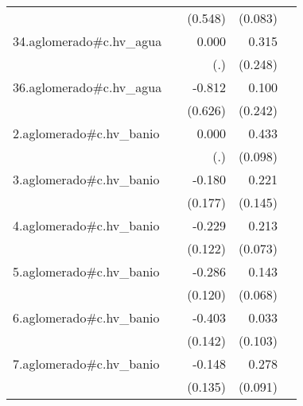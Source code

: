 {\begin{longtable}{l*{4}{D{.}{.}{-1}}}
            &                     &     (0.548)         &     (0.083)         &                     \\
\addlinespace
34.aglomerado#c.hv\_agua&                     &       0.000         &       0.315         &                     \\
            &                     &         (.)         &     (0.248)         &                     \\
\addlinespace
36.aglomerado#c.hv\_agua&                     &      -0.812         &       0.100         &                     \\
            &                     &     (0.626)         &     (0.242)         &                     \\
\addlinespace
2.aglomerado#c.hv\_banio&                     &       0.000         &       0.433\sym{***}&                     \\
            &                     &         (.)         &     (0.098)         &                     \\
\addlinespace
3.aglomerado#c.hv\_banio&                     &      -0.180         &       0.221         &                     \\
            &                     &     (0.177)         &     (0.145)         &                     \\
\addlinespace
4.aglomerado#c.hv\_banio&                     &      -0.229         &       0.213\sym{**} &                     \\
            &                     &     (0.122)         &     (0.073)         &                     \\
\addlinespace
5.aglomerado#c.hv\_banio&                     &      -0.286\sym{*}  &       0.143\sym{*}  &                     \\
            &                     &     (0.120)         &     (0.068)         &                     \\
\addlinespace
6.aglomerado#c.hv\_banio&                     &      -0.403\sym{**} &       0.033         &                     \\
            &                     &     (0.142)         &     (0.103)         &                     \\
\addlinespace
7.aglomerado#c.hv\_banio&                     &      -0.148         &       0.278\sym{**} &                     \\
            &                     &     (0.135)         &     (0.091)         &                     \\

\end{longtable}}
